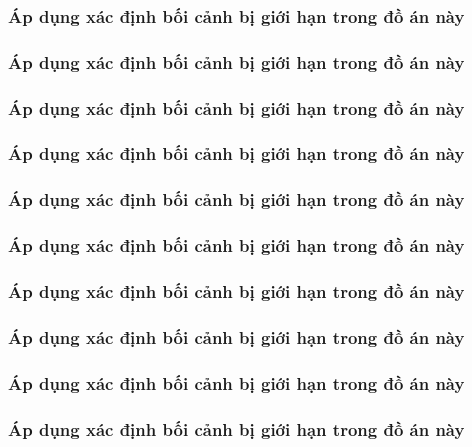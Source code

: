 \subsubsection{Áp dụng xác định bối cảnh bị giới hạn trong đồ án này}

\subsubsection{Áp dụng xác định bối cảnh bị giới hạn trong đồ án này}

\subsubsection{Áp dụng xác định bối cảnh bị giới hạn trong đồ án này}

\subsubsection{Áp dụng xác định bối cảnh bị giới hạn trong đồ án này}

\subsubsection{Áp dụng xác định bối cảnh bị giới hạn trong đồ án này}

\subsubsection{Áp dụng xác định bối cảnh bị giới hạn trong đồ án này}

\subsubsection{Áp dụng xác định bối cảnh bị giới hạn trong đồ án này}

\subsubsection{Áp dụng xác định bối cảnh bị giới hạn trong đồ án này}

\subsubsection{Áp dụng xác định bối cảnh bị giới hạn trong đồ án này}

\subsubsection{Áp dụng xác định bối cảnh bị giới hạn trong đồ án này}

